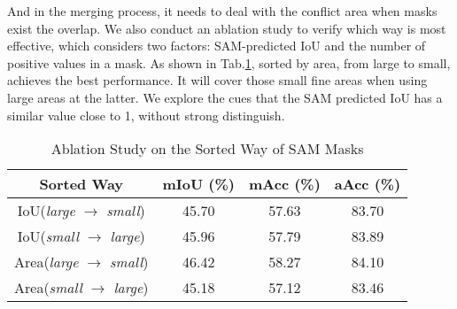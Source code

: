 \documentclass[lettersize,journal]{IEEEtran}
\begin{document}
And in the merging process, it needs to deal with the conflict area when masks exist the overlap. We also conduct an ablation study to verify which way is most effective, which considers two factors: SAM-predicted IoU and the number of positive values in a mask. 
As shown in Tab.\ref{tab:ablation_sortway}, sorted by area, from large to small, achieves the best performance. It will cover those small fine areas when using large areas at the latter. 
We explore the cues that the SAM predicted IoU has a similar value close to 1, without strong distinguish.


\begin{table}[]
\caption{Ablation Study on Individual Parts}
\captionsetup{justification=centering}
\label{tab:ablation_all}
\end{table} 
\begin{table}
\centering
\caption{Ablation Study on the Sorted Way of SAM Masks}
\begin{tabular}{c|ccc}
\hline
\textbf{Sorted Way}             & \textbf{mIoU (\%)} & \textbf{mAcc (\%)} & \textbf{aAcc (\%)} \\ \hline
IoU(\textit{large} $\rightarrow$ \textit{small})  & 45.70         & 57.63         & 83.70         \\
IoU(\textit{small} $\rightarrow$ \textit{large})  & 45.96         & 57.79         & 83.89         \\
Area(\textit{large} $\rightarrow$ \textit{small}) & 46.42         & 58.27         & 84.10         \\
Area(\textit{small} $\rightarrow$ \textit{large}) & 45.18         & 57.12         & 83.46         \\ \hline
\end{tabular}
\captionsetup{justification=centering}
\label{tab:ablation_sortway}
\end{table}
     
\end{document}

